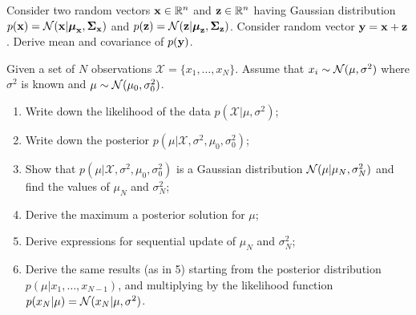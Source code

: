 \documentclass{amsml}
\begin{document}




\begin{problem}
Consider two random vectors $\bm{\mathbf{x}} \in {\mathbb R}^n$ and $\bm{\mathbf{z}} \in {\mathbb R}^n$ having Gaussian distribution  $p(\bm{\mathbf{x}}) = \mathcal{N}(\bm{\mathbf{x}} | \bm{\mathbf{\mu}}_{\bm{\mathbf{x}}}, \bm{\mathbf{\Sigma}}_{\bm{\mathbf{x}}})$ and  $p(\bm{\mathbf{z}}) = \mathcal{N}(\bm{\mathbf{z}} | \bm{\mathbf{\mu}}_{\bm{\mathbf{z}}}, \bm{\mathbf{\Sigma}}_{\bm{\mathbf{z}}})$.  Consider random vector $\bm{\mathbf{y}} = \bm{\mathbf{x}} + \bm{\mathbf{z}}$. Derive mean and covariance of $p(\bm{\mathbf{y}})$.

\end{problem}

\begin{problem}
Given a set of $N$ observations $\mathcal{X} = \{x_1,\dots,x_N\}$. Assume that $x_i \sim \mathcal{N}(\mu,\sigma^2)$ where $\sigma^2$ is known and $\mu \sim \mathcal{N}(\mu_0,\sigma_0^2)$. 
\begin{enumerate}
\item Write down the likelihood of the data $p(\mathcal{X}|\mu,\sigma^2)$;
\item Write down the posterior $p(\mu|\mathcal{X},\sigma^2, \mu_0,\sigma_0^2)$;
\item Show that $p(\mu|\mathcal{X},\sigma^2, \mu_0,\sigma_0^2)$ is a Gaussian distribution $\mathcal{N}(\mu|\mu_N,\sigma_N^2)$ and find the values of $\mu_N$ and $\sigma_N^2$;
\item Derive the maximum a posterior solution for $\mu$;
\item Derive expressions for sequential update of $\mu_N$ and $\sigma_N^2$;
\item Derive the same results (as in 5) starting from the posterior distribution $p(\mu|x_1,\dots,x_{N-1})$, and multiplying by the likelihood function $p(x_N |\mu) = \mathcal{N}(x_N |\mu,\sigma^2)$.
\end{enumerate}
\end{problem}
\end{document}
